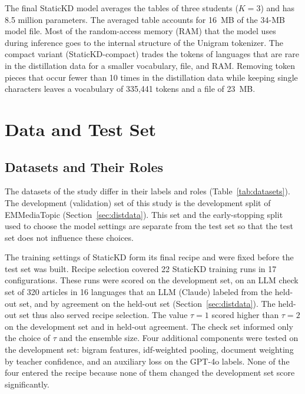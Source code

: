 \documentclass{ieeeaccess}
\begin{document}
The final StaticKD model averages the tables of three students ($K=3$) and has 8.5 million parameters. The averaged table accounts for 16~MB of the 34-MB model file. Most of the random-access memory (RAM) that the model uses during inference goes to the internal structure of the Unigram tokenizer. The compact variant (StaticKD-compact) trades the tokens of languages that are rare in the distillation data for a smaller vocabulary, file, and RAM. Removing token pieces that occur fewer than 10 times in the distillation data while keeping single characters leaves a vocabulary of 335,441 tokens and a file of 23~MB.

\section{Data and Test Set}
\label{sec:data}
\subsection{Datasets and Their Roles}
\label{sec:roles}
The datasets of the study differ in their labels and roles (Table~\ref{tab:datasets}). The development (validation) set of this study is the development split of EMMediaTopic (Section~\ref{sec:distdata}). This set and the early-stopping split used to choose the model settings are separate from the test set so that the test set does not influence these choices.

The training settings of StaticKD form its final recipe and were fixed before the test set was built. Recipe selection covered 22 StaticKD training runs in 17 configurations. These runs were scored on the development set, on an LLM check set of 320 articles in 16 languages that an LLM (Claude) labeled from the held-out set, and by agreement on the held-out set (Section~\ref{sec:distdata}). The held-out set thus also served recipe selection. The value $\tau=1$ scored higher than $\tau=2$ on the development set and in held-out agreement. The check set informed only the choice of $\tau$ and the ensemble size. Four additional components were tested on the development set: bigram features, idf-weighted pooling, document weighting by teacher confidence, and an auxiliary loss on the GPT-4o labels. None of the four entered the recipe because none of them changed the development set score significantly.
\end{document}
